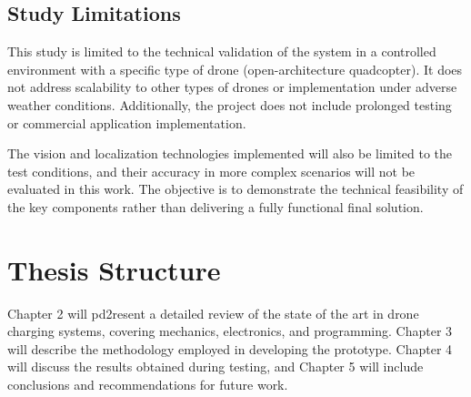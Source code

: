 \subsection{Study Limitations}

This study is limited to the technical validation of the system in a controlled environment with a specific type of drone (open-architecture quadcopter). It does not address scalability to other types of drones or implementation under adverse weather conditions. Additionally, the project does not include prolonged testing or commercial application implementation.

The vision and localization technologies implemented will also be limited to the test conditions, and their accuracy in more complex scenarios will not be evaluated in this work. The objective is to demonstrate the technical feasibility of the key components rather than delivering a fully functional final solution.

\section{Thesis Structure}

Chapter 2 will pd2resent a detailed review of the state of the art in drone charging systems, covering mechanics, electronics, and programming. Chapter 3 will describe the methodology employed in developing the prototype. Chapter 4 will discuss the results obtained during testing, and Chapter 5 will include conclusions and recommendations for future work.
